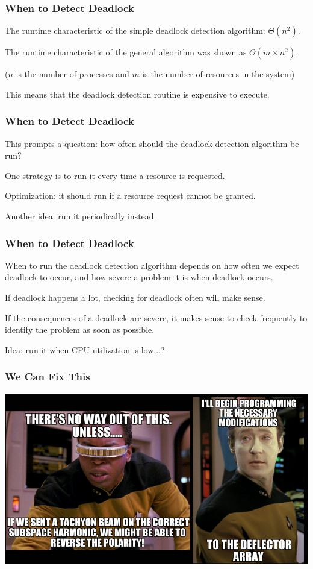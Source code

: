 \begin{frame}
	\frametitle{When to Detect Deadlock}

	The runtime characteristic of the simple deadlock detection algorithm: $\Theta(n^{2})$.

	The runtime characteristic of the general algorithm was shown as $\Theta(m \times n^{2})$.

	($n$ is the number of processes and $m$ is the number of resources in the system)

	This means that the deadlock detection routine is expensive to execute.


\end{frame}

\begin{frame}
	\frametitle{When to Detect Deadlock}

	This prompts a question: how often should the deadlock detection algorithm be run?

	One strategy is to run it every time a resource is requested.

	Optimization: it should run if a resource request cannot be granted.

	Another idea: run it periodically instead.

\end{frame}

\begin{frame}
	\frametitle{When to Detect Deadlock}

	When to run the deadlock detection algorithm depends on how often we expect deadlock to occur, and how severe a problem it is when deadlock occurs.

	If deadlock happens a lot, checking for deadlock often will make sense.

	If the consequences of a deadlock are severe, it makes sense to check frequently to identify the problem as soon as possible.

	Idea: run it when CPU utilization is low...?

\end{frame}


\begin{frame}
	\frametitle{We Can Fix This}

	\begin{center}
		\includegraphics[width=\textwidth]{images/recovery.png}
	\end{center}

\end{frame}


